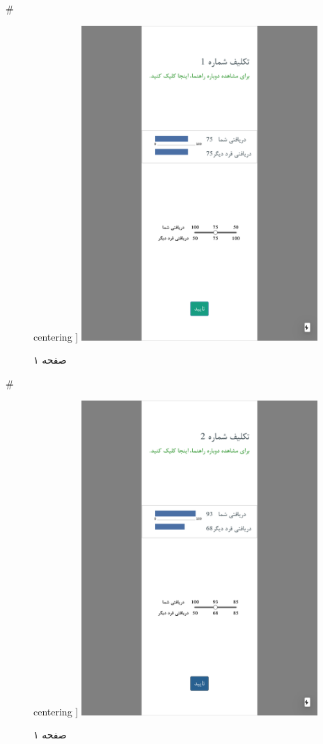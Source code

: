 { 
 # 
\begin{figure}[htpb]
centering ]
\includegraphics[width=0.8\textwidth]{./img/Task42.png/}
\caption{صفحه ۱}
\label{fig:Task1}
\end{figure}
 
 
 # 
\begin{figure}[htpb]
centering ]
\includegraphics[width=0.8\textwidth]{./img/Task43.png/}
\caption{صفحه ۱}
\label{fig:Task1}
\end{figure}
 
}
